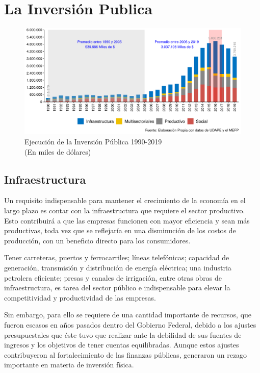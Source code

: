\section{La Inversión Publica}
\begin{figure}[!h]
	\centering
\caption{\label{fig:inversion}Ejecución de la Inversión Pública  1990-2019 \\ (En miles de dólares)}
	\includegraphics[scale=0.7]{Imagenes/inversion1.pdf}	
\end{figure}


\subsection{Infraestructura}
Un requisito indispensable para mantener el crecimiento de la economía en el largo plazo es contar con la infraestructura que requiere el sector productivo. Esto contribuirá a que
las empresas funcionen con mayor eficiencia y sean más productivas, toda vez que se reflejaría en una disminución de los costos de producción, con un beneficio directo para los consumidores.

Tener carreteras, puertos y ferrocarriles; líneas telefónicas; capacidad de generación, transmisión y distribución de energía eléctrica; una industria petrolera eficiente; presas y canales de irrigación, entre otras obras de infraestructura, es tarea del sector público e indispensable para elevar la competitividad y productividad de las empresas.

Sin embargo, para ello se requiere de una cantidad importante de recursos, que fueron escasos en años pasados dentro del Gobierno Federal, debido a los ajustes presupuestales que éste tuvo que realizar ante la debilidad de sus fuentes de ingresos y los objetivos de tener cuentas equilibradas. Aunque
estos ajustes contribuyeron al fortalecimiento de las finanzas públicas, generaron un rezago importante en materia de
inversión física. 


